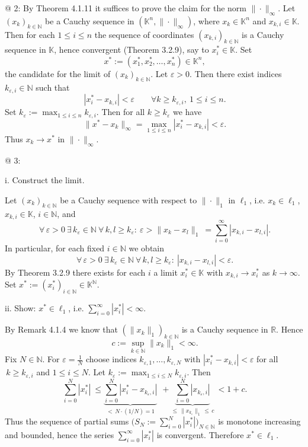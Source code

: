 \documentclass[12pt]{article}
\newcommand{\N}{\mathbb{N}}
\newcommand{\R}{\mathbb{R}}
\newcommand{\K}{\mathbb{K}} %
\newcommand{\eps}{\varepsilon}
\begin{document}
@ 2: By Theorem 4.1.11 it suffices to prove the claim for the norm $\|\cdot\|_\infty$. Let $(x_k)_{k\in\N}$ be a Cauchy sequence in $(\K^{n},\|\cdot\|_{\infty})$, where $x_k\in\K^n$ and $x_{k,i}\in\K$. Then for each $1\le i\le n$ the sequence of coordinates $(x_{k,i})_{k\in\N}$ is a Cauchy sequence in $\K$, hence convergent (Theorem 3.2.9), say to $x_i^{\ast}\in\K$. Set
\[
	\ x^{\ast} := (x_1^{\ast},x_2^{\ast},\dots,x_n^{\ast}) \in \K^{n},
\]
the candidate for the limit of $(x_k)_{k\in\N}$. Let $\eps>0$. Then there exist indices $k_{\eps,i}\in\N$ such that
\[
	\ |x_i^{\ast}-x_{k,i}| < \eps \qquad \forall k\ge k_{\eps,i},\ 1\le i\le n.
\]
Set $k_{\eps} := \max_{1\le i\le n} k_{\eps,i}$. Then for all $k\ge k_{\eps}$ we have
\[
	\ \|x^{\ast}-x_k\|_{\infty} 
		 = \max_{1\le i\le n} |x_i^{\ast}-x_{k,i}| 
		 < \eps.
\]
Thus $x_k\to x^{\ast}$ in $\|\cdot\|_{\infty}$.

@ 3:

i. Construct the limit.

Let $(x_k)_{k\in\N}$ be a Cauchy sequence with respect to $\|\cdot\|_{1}$ in $\ell_{1}$, i.e. $x_k\in\ell_{1}$, $x_{k,i}\in\K$, $i\in\N$, and
\[
	\ \forall\,\eps>0\ \exists\,k_{\eps}\in\N\ \forall\,k,l\ge k_{\eps} :\ \eps > \|x_k-x_l\|_{1} 
		\ = \sum_{i=0}^{\infty} |x_{k,i}-x_{l,i}|.
\]
In particular, for each fixed $i\in\N$ we obtain
\[
	\ \forall\,\eps>0\ \exists\,k_{\eps}\in\N\ \forall\,k,l\ge k_{\eps} :\ |x_{k,i}-x_{l,i}|<\eps.
\]
By Theorem 3.2.9 there exists for each $i$ a limit $x_i^{\ast}\in\K$ with $x_{k,i}\to x_i^{\ast}$ as $k\to\infty$. Set $x^{\ast}:=(x_i^{\ast})_{i\in\N}\in\K^{\N}$.

ii. Show: $x^{\ast}\in \ell_{1}$, i.e. $\sum_{i=0}^{\infty} |x_i^{\ast}| < \infty$.

By Remark 4.1.4 we know that $(\|x_k\|_{1})_{k\in\N}$ is a Cauchy sequence in $\R$. Hence
\[
	\ c := \sup_{k\in\N} \|x_k\|_{1} < \infty.
\]
Fix $N\in\N$. For $\eps=\tfrac{1}{N}$ choose indices $k_{\eps,1},\dots,k_{\eps,N}$ with $|x_i^{\ast}-x_{k,i}|<\eps$ for all $\,k\ge k_{\eps,i}$ and $1\le i\le N$. Let $k_{\eps}:=\max_{1\le i\le N} k_{\eps,i}$. Then
\[
	\ \sum_{i=0}^{N} |x_i^{\ast}|
		\ \le \underbrace{\sum_{i=0}^{N} |x_i^{\ast}-x_{k_{\eps},i}|}_{<\,N\cdot(1/N)=1}
		\ \ + \underbrace{\sum_{i=0}^{N} |x_{k_{\eps},i}|}_{\le\,\|x_{k_{\eps}}\|_{1}\,\le\,c}
		\ < 1 + c.
\]
Thus the sequence of partial sums $\big(S_N:=\sum_{i=0}^{N} |x_i^{\ast}|\big)_{N\in\N}$ is monotone increasing and bounded, hence the series $\sum_{i=0}^{\infty} |x_i^{\ast}|$ is convergent. Therefore $x^{\ast}\in\ell_{1}$.
\end{document}
